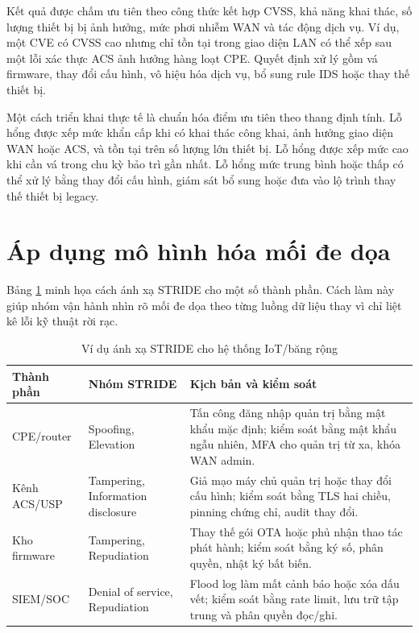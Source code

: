 \documentclass[../DoAn.tex]{subfiles}
\begin{document}
Kết quả được chấm ưu tiên theo công thức kết hợp CVSS, khả năng khai thác, số lượng thiết bị bị ảnh hưởng, mức phơi nhiễm WAN và tác động dịch vụ. Ví dụ, một CVE có CVSS cao nhưng chỉ tồn tại trong giao diện LAN có thể xếp sau một lỗi xác thực ACS ảnh hưởng hàng loạt CPE. Quyết định xử lý gồm vá firmware, thay đổi cấu hình, vô hiệu hóa dịch vụ, bổ sung rule IDS hoặc thay thế thiết bị.

Một cách triển khai thực tế là chuẩn hóa điểm ưu tiên theo thang định tính. Lỗ hổng được xếp mức khẩn cấp khi có khai thác công khai, ảnh hưởng giao diện WAN hoặc ACS, và tồn tại trên số lượng lớn thiết bị. Lỗ hổng được xếp mức cao khi cần vá trong chu kỳ bảo trì gần nhất. Lỗ hổng mức trung bình hoặc thấp có thể xử lý bằng thay đổi cấu hình, giám sát bổ sung hoặc đưa vào lộ trình thay thế thiết bị legacy.

\section{Áp dụng mô hình hóa mối đe dọa}
Bảng \ref{tab:stride-example} minh họa cách ánh xạ STRIDE cho một số thành phần. Cách làm này giúp nhóm vận hành nhìn rõ mối đe dọa theo từng luồng dữ liệu thay vì chỉ liệt kê lỗi kỹ thuật rời rạc.

\begin{table}[H]
\centering
\begin{tabular}{|p{2.7cm}|p{3.2cm}|p{5.9cm}|}
\hline
\textbf{Thành phần} & \textbf{Nhóm STRIDE} & \textbf{Kịch bản và kiểm soát} \\ \hline
CPE/router & Spoofing, Elevation & Tấn công đăng nhập quản trị bằng mật khẩu mặc định; kiểm soát bằng mật khẩu ngẫu nhiên, MFA cho quản trị từ xa, khóa WAN admin. \\ \hline
Kênh ACS/USP & Tampering, Information disclosure & Giả mạo máy chủ quản trị hoặc thay đổi cấu hình; kiểm soát bằng TLS hai chiều, pinning chứng chỉ, audit thay đổi. \\ \hline
Kho firmware & Tampering, Repudiation & Thay thế gói OTA hoặc phủ nhận thao tác phát hành; kiểm soát bằng ký số, phân quyền, nhật ký bất biến. \\ \hline
SIEM/SOC & Denial of service, Repudiation & Flood log làm mất cảnh báo hoặc xóa dấu vết; kiểm soát bằng rate limit, lưu trữ tập trung và phân quyền đọc/ghi. \\ \hline
\end{tabular}
\caption{Ví dụ ánh xạ STRIDE cho hệ thống IoT/băng rộng}
\label{tab:stride-example}
\end{table}
\end{document}
